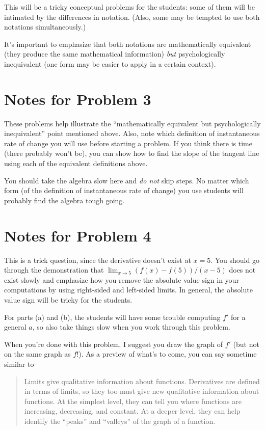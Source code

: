 \documentclass[nooutcomes]{ximera}
\begin{document}
This will be a tricky conceptual problems for the students: some of them will be intimated by the differences in notation.
(Also, some may be tempted to use both notations simultaneously.)

It's important to emphasize that both notations are mathematically equivalent (they produce the same mathematical information) \emph{but} psychologically inequivalent (one form may be easier to apply in a certain context).

\section{Notes for Problem 3}
These problems help illustrate the ``mathematically equivalent but psychologically inequivalent'' point mentioned above.
Also, note which definition of instantaneous rate of change you will use before starting a problem.
If you think there is time (there probably won't be), you can show how to find the slope of the tangent line using each of the equivalent definitions above.

You should take the algebra slow here and \emph{do not} skip steps.
No matter which form (of the definition of instantaneous rate of change) you use students will probably find the algebra tough going.


\section{Notes for Problem 4}
This is a trick question, since the derivative doesn't exist at $x = 5$.
You should go through the demonstration that $\lim_{x \to 5} (f(x) - f(5))/(x - 5)$ does not exist slowly and emphasize how you remove the absolute value sign in your computations by using right-sided and left-sided limits.
In general, the absolute value sign will be tricky for the students.

For parts (a) and (b), the students will have some trouble computing $f'$ for a general $a$, so also take things slow when you work through this problem.


When you're done with this problem, I suggest you draw the graph of $f'$ (but not on the same graph as $f$!).
As a preview of what's to come, you can say sometime similar to
\begin{quote}
  Limits give qualitative information about functions.
  Derivatives are defined in terms of limits, so they too must give new qualitative information about functions.
  At the simplest level, they can tell you where functions are increasing, decreasing, and constant.
  At a deeper level, they can help identify the ``peaks'' and ``valleys'' of the graph of a function.
\end{quote}
\end{document}
